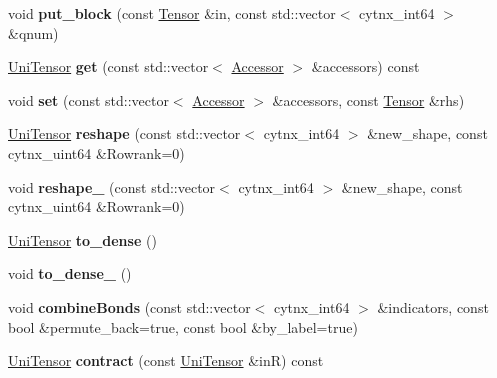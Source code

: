 \begin{DoxyCompactItemize}
\item 
\mbox{\label{classcytnx_1_1UniTensor_a9bf19662043d456a89a8e51215c67beb}} 
void {\bfseries put\+\_\+block} (const \hyperlink{classcytnx_1_1Tensor}{Tensor} \&in, const std\+::vector$<$ cytnx\+\_\+int64 $>$ \&qnum)
\item 
\mbox{\label{classcytnx_1_1UniTensor_a2e2d7f3137bb1cfb26e6a19acbc9563e}} 
\hyperlink{classcytnx_1_1UniTensor}{Uni\+Tensor} {\bfseries get} (const std\+::vector$<$ \hyperlink{classcytnx_1_1Accessor}{Accessor} $>$ \&accessors) const
\item 
\mbox{\label{classcytnx_1_1UniTensor_a90ba42a96ac324dfea7436d383fecc79}} 
void {\bfseries set} (const std\+::vector$<$ \hyperlink{classcytnx_1_1Accessor}{Accessor} $>$ \&accessors, const \hyperlink{classcytnx_1_1Tensor}{Tensor} \&rhs)
\item 
\mbox{\label{classcytnx_1_1UniTensor_a6c749dc601952c239225903371ddb669}} 
\hyperlink{classcytnx_1_1UniTensor}{Uni\+Tensor} {\bfseries reshape} (const std\+::vector$<$ cytnx\+\_\+int64 $>$ \&new\+\_\+shape, const cytnx\+\_\+uint64 \&Rowrank=0)
\item 
\mbox{\label{classcytnx_1_1UniTensor_aa1047de2e99ac2abd79ff4f74145d543}} 
void {\bfseries reshape\+\_\+} (const std\+::vector$<$ cytnx\+\_\+int64 $>$ \&new\+\_\+shape, const cytnx\+\_\+uint64 \&Rowrank=0)
\item 
\mbox{\label{classcytnx_1_1UniTensor_a4aeec131076ae541e8be7cdb930e151b}} 
\hyperlink{classcytnx_1_1UniTensor}{Uni\+Tensor} {\bfseries to\+\_\+dense} ()
\item 
\mbox{\label{classcytnx_1_1UniTensor_a169c56f48f851fe173067632e30200dc}} 
void {\bfseries to\+\_\+dense\+\_\+} ()
\item 
\mbox{\label{classcytnx_1_1UniTensor_a0a75eb4843d626eacb86fc42a75d1c13}} 
void {\bfseries combine\+Bonds} (const std\+::vector$<$ cytnx\+\_\+int64 $>$ \&indicators, const bool \&permute\+\_\+back=true, const bool \&by\+\_\+label=true)
\item 
\mbox{\label{classcytnx_1_1UniTensor_a24534b89eccb629a67d51ee7ae36a112}} 
\hyperlink{classcytnx_1_1UniTensor}{Uni\+Tensor} {\bfseries contract} (const \hyperlink{classcytnx_1_1UniTensor}{Uni\+Tensor} \&inR) const
\end{DoxyCompactItemize}

